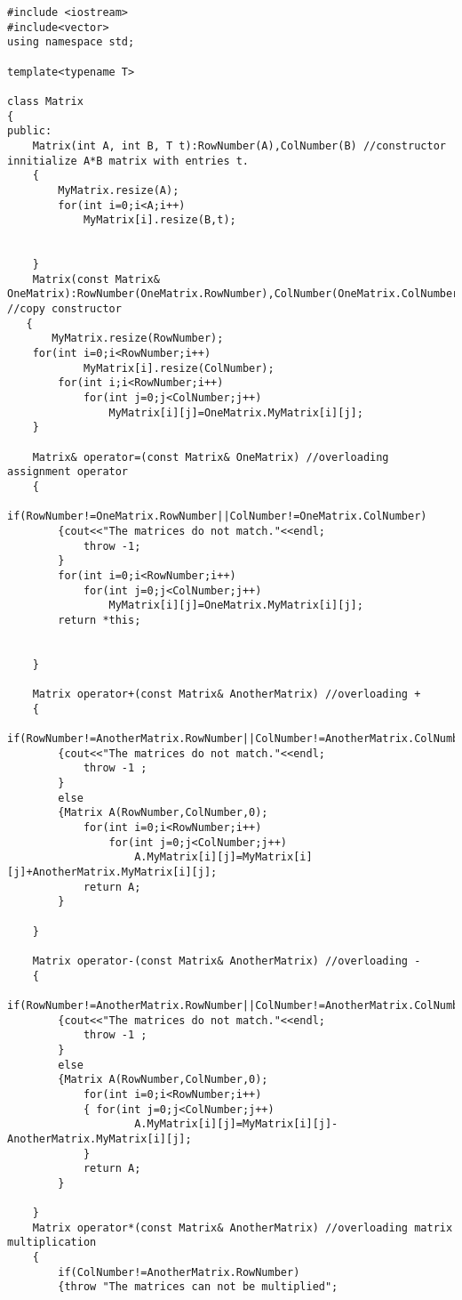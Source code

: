 \documentclass[12pt]{article}
\begin{document}
\begin{lstlisting}
#include <iostream>
#include<vector>
using namespace std;

template<typename T>

class Matrix
{
public:
    Matrix(int A, int B, T t):RowNumber(A),ColNumber(B) //constructor innitialize A*B matrix with entries t.
    {
        MyMatrix.resize(A);
        for(int i=0;i<A;i++)
            MyMatrix[i].resize(B,t);
        
        
    }
    Matrix(const Matrix& OneMatrix):RowNumber(OneMatrix.RowNumber),ColNumber(OneMatrix.ColNumber) //copy constructor
   {
       MyMatrix.resize(RowNumber);
    for(int i=0;i<RowNumber;i++)
            MyMatrix[i].resize(ColNumber);
        for(int i;i<RowNumber;i++)
            for(int j=0;j<ColNumber;j++)
                MyMatrix[i][j]=OneMatrix.MyMatrix[i][j];
    }
    
    Matrix& operator=(const Matrix& OneMatrix) //overloading assignment operator
    {
        if(RowNumber!=OneMatrix.RowNumber||ColNumber!=OneMatrix.ColNumber)
        {cout<<"The matrices do not match."<<endl;
            throw -1;
        }
        for(int i=0;i<RowNumber;i++)
            for(int j=0;j<ColNumber;j++)
                MyMatrix[i][j]=OneMatrix.MyMatrix[i][j];
        return *this;
        

    }
    
    Matrix operator+(const Matrix& AnotherMatrix) //overloading +
    {
        if(RowNumber!=AnotherMatrix.RowNumber||ColNumber!=AnotherMatrix.ColNumber)
        {cout<<"The matrices do not match."<<endl;
            throw -1 ;
        }
        else
        {Matrix A(RowNumber,ColNumber,0);
            for(int i=0;i<RowNumber;i++)
                for(int j=0;j<ColNumber;j++)
                    A.MyMatrix[i][j]=MyMatrix[i][j]+AnotherMatrix.MyMatrix[i][j];
            return A;
        }
        
    }
    
    Matrix operator-(const Matrix& AnotherMatrix) //overloading -
    {
        if(RowNumber!=AnotherMatrix.RowNumber||ColNumber!=AnotherMatrix.ColNumber)
        {cout<<"The matrices do not match."<<endl;
            throw -1 ;
        }
        else
        {Matrix A(RowNumber,ColNumber,0);
            for(int i=0;i<RowNumber;i++)
            { for(int j=0;j<ColNumber;j++)
                    A.MyMatrix[i][j]=MyMatrix[i][j]-AnotherMatrix.MyMatrix[i][j];
            }
            return A;
        }

    }
    Matrix operator*(const Matrix& AnotherMatrix) //overloading matrix multiplication
    {
        if(ColNumber!=AnotherMatrix.RowNumber)
        {throw "The matrices can not be multiplied";
            

\end{lstlisting}
\end{document}
